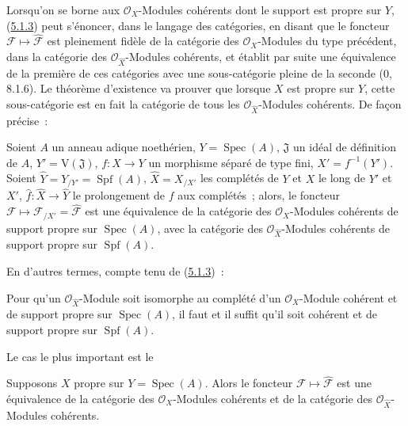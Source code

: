 Lorsqu'on se borne aux $\mathcal O_X$-Modules cohérents dont le support est propre
sur $Y$, (\hyperref[III.5.1.3-fr]{5.1.3}) peut s'énoncer, dans le langage des
catégories, en disant que le foncteur
$\mathcal F\mapsto\widehat{\mathcal F}$ est pleinement fidèle de la catégorie des
$\mathcal O_X$-Modules du type précédent, dans la catégorie des
$\mathcal O_{\widehat X}$-Modules cohérents, et établit par suite une équivalence de
la première de ces catégories avec une sous-catégorie pleine de la seconde
($0$, 8.1.6). Le théorème d'existence va prouver que lorsque $X$ est propre sur $Y$,
cette sous-catégorie est en fait la catégorie de tous les
$\mathcal O_{\widehat X}$-Modules cohérents. De façon précise~:

\begin{theorem}[5.1.4]
\label{III.5.1.4-fr}
Soient $A$ un anneau adique noethérien, $Y=\operatorname{Spec}(A)$,
$\mathfrak J$ un idéal de définition de $A$, $Y'=\mathrm V(\mathfrak J)$,
$f:X\to Y$ un morphisme séparé de type fini, $X'=f^{-1}(Y')$. Soient
$\widehat Y=Y_{/Y'}=\operatorname{Spf}(A)$, $\widehat X=X_{/X'}$ les complétés de
$Y$ et $X$ le long de $Y'$ et $X'$, $\widehat f:\widehat X\to\widehat Y$ le
prolongement de $f$ aux complétés~; alors, le foncteur
$\mathcal F\mapsto\mathcal F_{/X'}=\widehat{\mathcal F}$ est une équivalence de la
catégorie des $\mathcal O_X$-Modules cohérents de support propre sur
$\operatorname{Spec}(A)$, avec la catégorie des $\mathcal O_{\widehat X}$-Modules
cohérents de support propre sur $\operatorname{Spf}(A)$.
\end{theorem}

En d'autres termes, compte tenu de (\hyperref[III.5.1.3-fr]{5.1.3})~:

\begin{corollary}[5.1.5]
\label{III.5.1.5-fr}
Pour qu'un $\mathcal O_{\widehat X}$-Module soit isomorphe au complété d'un
$\mathcal O_X$-Module cohérent et de support propre sur $\operatorname{Spec}(A)$,
il faut et il suffit qu'il soit cohérent et de support propre sur
$\operatorname{Spf}(A)$.
\end{corollary}

Le cas le plus important est le

\begin{corollary}[5.1.6]
\label{III.5.1.6-fr}
Supposons $X$ propre sur $Y=\operatorname{Spec}(A)$. Alors le foncteur
$\mathcal F\mapsto\widehat{\mathcal F}$ est une équivalence de la catégorie des
$\mathcal O_X$-Modules cohérents et de la catégorie des
$\mathcal O_{\widehat X}$-Modules cohérents.
\end{corollary}


